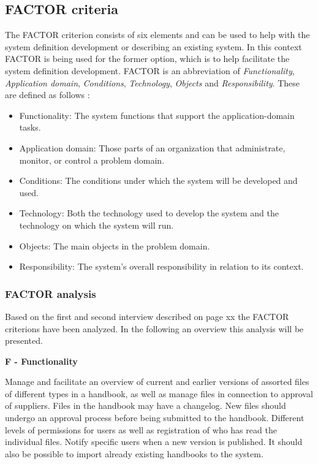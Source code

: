 \subsection{FACTOR criteria} \label{sec:factorcriteria}
The FACTOR criterion consists of six elements and can be used to help with the system definition development or describing an existing system.
In this context FACTOR is being used for the former option, which is to help facilitate the system definition development.
FACTOR is an abbreviation of \textit{Functionality}, \textit{Application domain}, \textit{Conditions}, \textit{Technology}, \textit{Objects} and \textit{Responsibility}.
These are defined as follows \citep[p.~40]{Rod-Aalborg}:
\begin{itemize}
	\item
		Functionality:
		The system functions that support the application-domain tasks.
	\item
		Application domain:
		Those parts of an organization that administrate, monitor, or control a problem domain.
	\item
		Conditions:
		The conditions under which the system will be developed and used.
	\item
		Technology:
		Both the technology used to develop the system and the technology on which the system will run.
	\item
		Objects:
		The main objects in the problem domain.
	\item
		Responsibility:
		The system’s overall responsibility in relation to its context.
\end{itemize}

\subsubsection{FACTOR analysis}
Based on the first and second interview described on {\color{red}page xx} the FACTOR criterions have been analyzed.
In the following an overview this analysis will be presented.

\textbf{F - Functionality}

Manage and facilitate an overview of current and earlier versions of assorted files of different types in a handbook, as well as manage files in connection to approval of suppliers.
Files in the handbook may have a changelog.
New files should undergo an approval process before being submitted to the handbook.
Different levels of permissions for users as well as registration of who has read the individual files.
Notify specific users when a new version is published.
It should also be possible to import already existing handbooks to the system.

